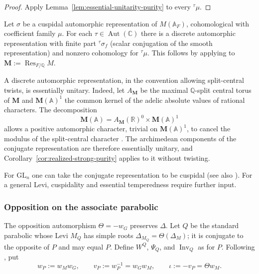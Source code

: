 \documentclass[12pt]{amsart}
\numberwithin{equation}{section}
\theoremstyle{plain}
\theoremstyle{definition}
\theoremstyle{remark}
\DeclareMathOperator{\Inv}{Inv}
\begin{document}
\begin{proof}
Apply Lemma~\ref{lem:essential-unitarity-purity} to every ${}^{\tau}\! \mu$.
\end{proof}

Let $\sigma$ be a cuspidal automorphic representation of $M(\mathbb A_F)$,
cohomological with coefficient family $\mu$. For each
$\tau\in\operatorname{Aut}(\mathbb C)$ there is a discrete automorphic
representation with finite part ${}^{\tau}\sigma_f$ (scalar conjugation
of the smooth representation) and nonzero cohomology for ${}^{\tau}\mu$.
This follows by applying \cite[Prop.~2.4]{GanRaghuram2013} to
$\mathbf M:=\operatorname{Res}_{F/\mathbb Q}M$.

A discrete automorphic representation, in the convention allowing split-central twists, is essentially unitary. Indeed, let $A_{\mathbf M}$ be the maximal $\mathbb Q$-split central torus of $\mathbf M$ and $\mathbf M(\mathbb A)^1$ the common kernel of the adelic absolute values of rational characters. The decomposition 
\[
 \mathbf M(\mathbb A)
 =A_{\mathbf M}(\mathbb R)^0\times\mathbf M(\mathbb A)^1
\]
allows a positive automorphic character, trivial on $\mathbf M(\mathbb A)^1$, to cancel the modulus of the split-central character \cite[\S3, p.~16]{Arthur2005}. The archimedean components of the conjugate representation are therefore essentially unitary, and Corollary~\ref{cor:realized-strong-purity} applies to it without twisting.

For $\mathrm{GL}_n$ one can take the conjugate representation to be cuspidal \cite{Clozel1990} (see also \cite[Theorem~3.1]{GanRaghuram2013}). For a general Levi, cuspidality and essential temperedness require
further input.

\subsubsection{Opposition on the associate parabolic}\label{sec:associate-parabolic}
The opposition automorphism $\Theta=-w_G$ preserves $\Delta$. Let $Q$ be the standard parabolic whose Levi $M_Q$ has simple roots $\Delta_{M_Q}=\Theta(\Delta_M)$; it is conjugate to the opposite of $P$ and may equal $P$. Define $W^Q$, $\Psi_Q$, and $\Inv_Q$ as for $P$. Following \cite[\S9.1.3]{HarderChapterNine}, put
\[
 w_P:=w_Mw_G,\qquad v_P:=w_P^{-1}=w_Gw_M,
 \qquad \iota:=-v_P=\Theta w_M.
\]
\end{document}
